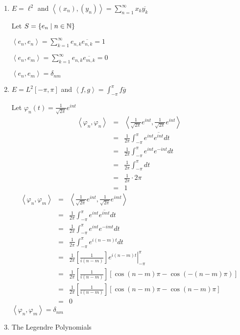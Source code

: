 \documentclass[letterpaper,12pt,fleqn]{article}
\newcommand{\inner}[1]{\left<#1\right>}
\newcommand{\conj}[1]{\overline{#1}}
\renewcommand{\d}{\delta}
\newcommand{\p}{\varphi}
\begin{document}
\begin{examples}
  \listbreak
  \begin{enumerate}
  \item $E=\ell^2$ and $\inner{(x_n),(y_n)}=\sum_{n=1}^{\infty}x_k\conj{y_k}$

    Let $S=\{e_n\mid n\in\mathbb{N}\}$

    $\inner{e_n,e_n}=\sum_{k=1}^{\infty}e_{n,k}\conj{e_{n,k}}=1$

    $\inner{e_n,e_m}=\sum_{k=1}^{\infty}e_{n,k}\conj{e_{m,k}}=0$

    $\inner{e_n,e_m}=\d_{nm}$

  \item $E=L^2[-\pi,\pi]$ and $\inner{f,g}=\int_{-\pi}^{\pi}f\conj{g}$

    Let $\p_n(t)=\frac{1}{\sqrt{2\pi}}e^{int}$
    \begin{eqnarray*}
      \inner{\p_n,\p_n} &=&
      \inner{\frac{1}{\sqrt{2\pi}}e^{int},\frac{1}{\sqrt{2\pi}}e^{int}} \\
      &=& \frac{1}{2\pi}\int_{-\pi}^{\pi}e^{int}\conj{e^{int}}dt \\
      &=& \frac{1}{2\pi}\int_{-\pi}^{\pi}e^{int}e^{-int}dt \\
      &=& \frac{1}{2\pi}\int_{-\pi}^{\pi}dt \\
      &=& \frac{1}{2\pi}\cdot2\pi \\
      &=& 1
    \end{eqnarray*}
    \begin{eqnarray*}
      \inner{\p_n,\p_m} &=&
      \inner{\frac{1}{\sqrt{2\pi}}e^{int},\frac{1}{\sqrt{2\pi}}e^{imt}} \\
      &=& \frac{1}{2\pi}\int_{-\pi}^{\pi}e^{int}\conj{e^{imt}}dt \\
      &=& \frac{1}{2\pi}\int_{-\pi}^{\pi}e^{int}e^{-imt}dt \\
      &=& \frac{1}{2\pi}\int_{-\pi}^{\pi}e^{i(n-m)t}dt \\
      &=& \left.\frac{1}{2\pi}\left[\frac{1}{i(n-m)}\right]e^{i(n-m)t}
      \right|_{-\pi}^{\pi} \\
      &=& \frac{1}{2\pi}\left[\frac{1}{i(n-m)}\right]
      [\cos(n-m)\pi-\cos(-(n-m)\pi)] \\
      &=& \frac{1}{2\pi}\left[\frac{1}{i(n-m)}\right]
      [\cos(n-m)\pi-\cos(n-m)\pi] \\
      &=& 0
    \end{eqnarray*}
    $\inner{\p_n,\p_m}=\d_{nm}$

  \item The Legendre Polynomials


\end{enumerate}
\end{examples}
\end{document}
